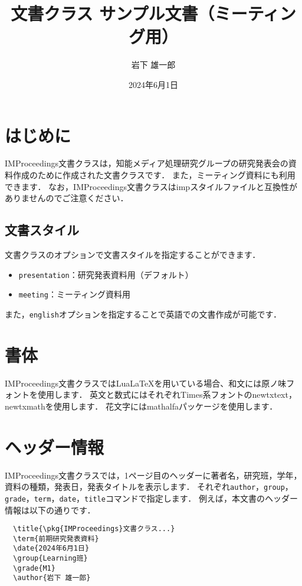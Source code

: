 \documentclass[lualatex,meeting]{improceedings}
\title{\pkg{IMProceedings}文書クラス サンプル文書（ミーティング用）}
\date{2024年6月1日}
\author{岩下 雄一郎}
\newcommand{\pkg}[1]{\textsf{#1}}
\newcommand{\code}[1]{\texttt{#1}}
\begin{document}
\maketitle

\section{はじめに}

\pkg{IMProceedings}文書クラスは，知能メディア処理研究グループの研究発表会の資料作成のために作成された文書クラスです．
また，ミーティング資料にも利用できます．
なお，\pkg{IMProceedings}文書クラスは\pkg{imp}スタイルファイルと互換性がありませんのでご注意ください．

\subsection{文書スタイル}

文書クラスのオプションで文書スタイルを指定することができます．
\begin{itemize}
  \item \code{presentation}：研究発表資料用（デフォルト）
  \item \code{meeting}：ミーティング資料用
\end{itemize}
また，\code{english}オプションを指定することで英語での文書作成が可能です．

\section{書体}

\pkg{IMProceedings}文書クラスではLuaLaTeXを用いている場合、和文には原ノ味フォントを使用します．
英文と数式にはそれぞれTimes系フォントの\pkg{newtxtext}，\pkg{newtxmath}を使用します．
花文字には\pkg{mathalfa}パッケージを使用します．

\section{ヘッダー情報}

\pkg{IMProceedings}文書クラスでは，1ページ目のヘッダーに著者名，研究班，学年，資料の種類，発表日，発表タイトルを表示します．
それぞれ\code{author}，\code{group}，\code{grade}，\code{term}，\code{date}，\code{title}コマンドで指定します．
例えば，本文書のヘッダー情報は以下の通りです．
\begin{verbatim}
  \title{\pkg{IMProceedings}文書クラス...}
  \term{前期研究発表資料}
  \date{2024年6月1日}
  \group{Learning班}
  \grade{M1}
  \author{岩下 雄一郎}
\end{verbatim}
\end{document}
